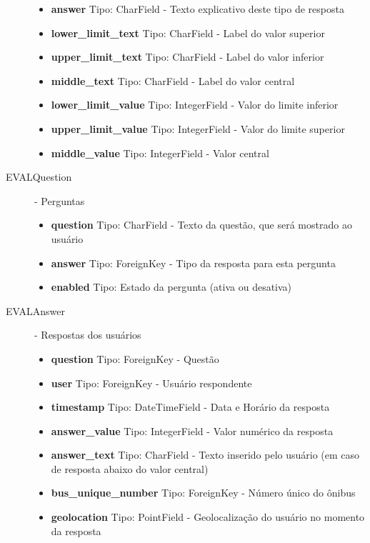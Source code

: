 \begin{description}
\begin{itemize}
            \item \textbf{answer} Tipo: CharField - Texto explicativo deste tipo de resposta
            \item \textbf{lower\_limit\_text} Tipo: CharField - Label do valor superior
            \item \textbf{upper\_limit\_text} Tipo: CharField - Label do valor inferior
            \item \textbf{middle\_text} Tipo: CharField - Label do valor central
            \item \textbf{lower\_limit\_value} Tipo: IntegerField - Valor do limite inferior
            \item \textbf{upper\_limit\_value} Tipo: IntegerField - Valor do limite superior
            \item \textbf{middle\_value} Tipo: IntegerField - Valor central
        \end{itemize}
    \item[EVALQuestion] - Perguntas
        \begin{itemize}
            \item \textbf{question} Tipo: CharField - Texto da questão, que será mostrado ao usuário
            \item \textbf{answer} Tipo: ForeignKey - Tipo da resposta para esta pergunta
            \item \textbf{enabled} Tipo: Estado da pergunta (ativa ou desativa)
        \end{itemize}
    \item[EVALAnswer] - Respostas dos usuários
        \begin{itemize}
            \item \textbf{question} Tipo: ForeignKey - Questão
            \item \textbf{user} Tipo: ForeignKey - Usuário respondente
            \item \textbf{timestamp} Tipo: DateTimeField - Data e Horário da resposta
            \item \textbf{answer\_value} Tipo: IntegerField - Valor numérico da resposta
            \item \textbf{answer\_text} Tipo: CharField - Texto inserido pelo usuário (em caso de resposta abaixo do valor central)
            \item \textbf{bus\_unique\_number} Tipo: ForeignKey - Número único do ônibus
            \item \textbf{geolocation} Tipo: PointField - Geolocalização do usuário no momento da resposta
        \end{itemize}
\end{description}

